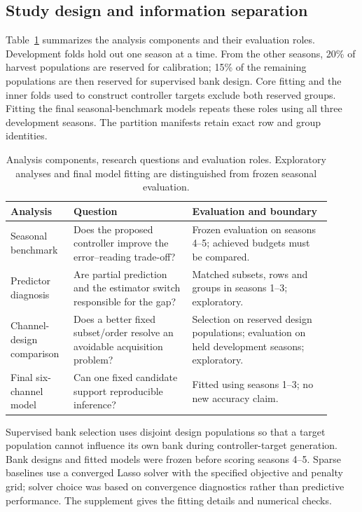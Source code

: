 \documentclass[Review,sagev,times]{sagej}
\begin{document}
\subsection{Study design and information separation}
Table~\ref{tab:stages} summarizes the analysis components and their evaluation roles. Development folds hold out one season at a time. From the other seasons, 20\% of harvest populations are reserved for calibration; 15\% of the remaining populations are then reserved for supervised bank design. Core fitting and the inner folds used to construct controller targets exclude both reserved groups. Fitting the final seasonal-benchmark models repeats these roles using all three development seasons. The partition manifests retain exact row and group identities.

\begin{table}[tbp]
\centering\small
\caption{Analysis components, research questions and evaluation roles. Exploratory analyses and final model fitting are distinguished from frozen seasonal evaluation.}\label{tab:stages}
\begin{tabular}{>{\raggedright\arraybackslash}p{0.17\linewidth}>{\raggedright\arraybackslash}p{0.34\linewidth}>{\raggedright\arraybackslash}p{0.40\linewidth}}
\toprule
Analysis & Question & Evaluation and boundary \\
\midrule
Seasonal benchmark & Does the proposed controller improve the error--reading trade-off? & Frozen evaluation on seasons 4--5; achieved budgets must be compared. \\
Predictor diagnosis & Are partial prediction and the estimator switch responsible for the gap? & Matched subsets, rows and groups in seasons 1--3; exploratory. \\
Channel-design comparison & Does a better fixed subset/order resolve an avoidable acquisition problem? & Selection on reserved design populations; evaluation on held development seasons; exploratory. \\
Final six-channel model & Can one fixed candidate support reproducible inference? & Fitted using seasons 1--3; no new accuracy claim. \\
\bottomrule
\end{tabular}
\end{table}

Supervised bank selection uses disjoint design populations so that a target population cannot influence its own bank during controller-target generation. Bank designs and fitted models were frozen before scoring seasons 4--5. Sparse baselines use a converged Lasso solver with the specified objective and penalty grid; solver choice was based on convergence diagnostics rather than predictive performance. The supplement gives the fitting details and numerical checks.
\end{document}
